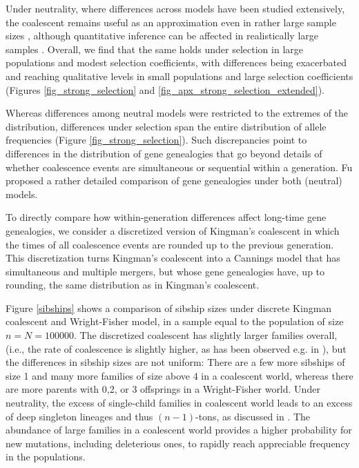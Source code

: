 \documentclass[review,nonatbib]{elsarticle}
\begin{document}
Under neutrality, where differences across models have been studied extensively, the coalescent remains useful 
as an approximation even in rather large sample sizes \cite{Fu2006}, although quantitative inference 
can be affected in realistically large samples \cite{BhaskarEtAl2014}. 
Overall, we find that the same holds under selection in 
large populations and modest selection coefficients, with differences being exacerbated and 
reaching qualitative levels in small populations and large selection coefficients 
(Figures \ref{fig_strong_selection} and \ref{fig_apx_strong_selection_extended}). 
 
Whereas differences among neutral models were restricted to the extremes of the distribution, 
differences under selection span the entire distribution of allele frequencies (Figure \ref{fig_strong_selection}). 
Such discrepancies point to differences in the distribution of gene genealogies that go beyond 
details of whether coalescence events are simultaneous or sequential within a generation. 
Fu \cite{Fu2006} proposed a rather detailed comparison of gene genealogies under both 
(neutral) models.
 
To directly compare how within-generation differences affect long-time gene genealogies, 
we consider a discretized version of Kingman's coalescent in which the times of 
all coalescence events are rounded up to the previous generation. 
This discretization turns Kingman's coalescent into a Cannings model that has simultaneous and 
multiple mergers, but whose gene genealogies have, up to rounding, the same distribution as in 
Kingman's coalescent. 

Figure \ref{sibships} shows a comparison of sibship sizes under discrete Kingman coalescent 
and Wright-Fisher model, in a sample equal to the population of size $n=N=100 000$. 
The discretized coalescent has slightly larger families overall,
 (i.e., the rate of coalescence is slightly higher, as has been observed e.g. in \cite{Fu2006}), but 
the differences in sibship sizes are not uniform: There are a few more sibships of size 1 and many more families of size above 4 
in a coalescent world, whereas there are more parents with 0,2, or 3 offsprings in a Wright-Fisher world. Under neutrality, 
the excess of single-child families in coalescent world leads to an excess of deep singleton lineages and thus $(n-1)$-tons,
as discussed in \cite{Fu2006}. The abundance of large families in a coalescent world provides a higher probability for
 new mutations, including deleterious ones, to rapidly reach appreciable frequency in the populations. 
 
\end{document}
